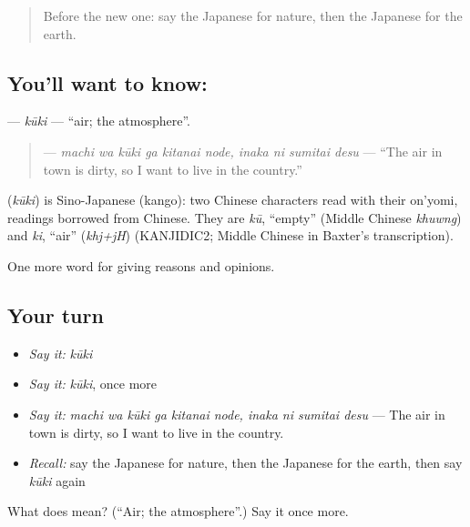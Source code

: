 \begin{quote}
Before the new one: say the Japanese for nature, then the Japanese for the earth.
\end{quote}

\subsection*{You'll want to know: }
\textbf{} — \emph{kūki} — \textquotedblleft{}air; the atmosphere\textquotedblright{}.

\begin{quote}
\textbf{   } — \emph{machi wa kūki ga kitanai node, inaka ni sumitai desu} — \textquotedblleft{}The air in town is dirty, so I want to live in the country.\textquotedblright{}
\end{quote}

\begin{cousinweb}
\textbf{} (\emph{kūki}) is Sino-Japanese (kango): two Chinese characters read with their on'yomi, readings borrowed from Chinese. They are \emph{kū}, \textquotedblleft{}empty\textquotedblright{} (Middle Chinese \emph{khuwng}) and \emph{ki}, \textquotedblleft{}air\textquotedblright{} (\emph{khj+jH}) (KANJIDIC2; Middle Chinese in Baxter's transcription).
\end{cousinweb}

\begin{grammarlens}[title={What you've built}]
One more word for giving reasons and opinions.
\end{grammarlens}

\subsection*{Your turn}
\begin{itemize}
\raggedright
  \item \emph{Say it:} \emph{kūki}
  \item \emph{Say it:} \emph{kūki}, once more
  \item \emph{Say it:} \emph{machi wa kūki ga kitanai node, inaka ni sumitai desu} — The air in town is dirty, so I want to live in the country.
  \item \emph{Recall:} say the Japanese for nature, then the Japanese for the earth, then say \emph{kūki} again
\end{itemize}

\begin{tcolorbox}[breakable,colback=teal!4,colframe=teal!35!black,title={Before you move on}]
What does  mean? (\textquotedblleft{}Air; the atmosphere\textquotedblright{}.) Say it once more.
\end{tcolorbox}

